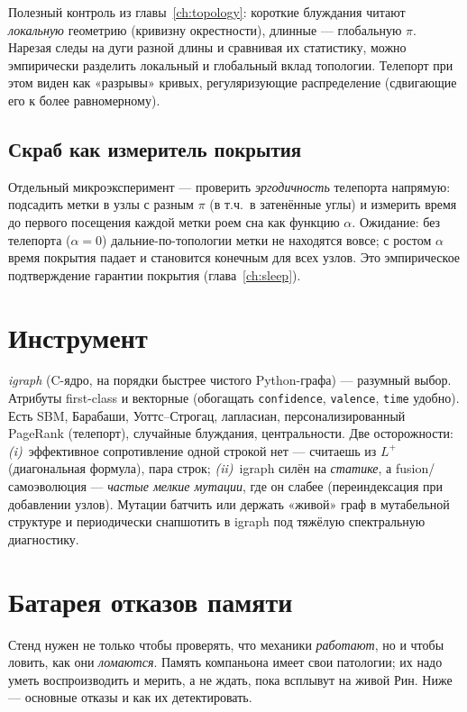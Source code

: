 Полезный контроль из главы~\ref{ch:topology}: короткие блуждания читают
\emph{локальную} геометрию (кривизну окрестности), длинные — глобальную $\pi$.
Нарезая следы на дуги разной длины и сравнивая их статистику, можно эмпирически
разделить локальный и глобальный вклад топологии. Телепорт при этом виден как
«разрывы» кривых, регуляризующие распределение (сдвигающие его к более равномерному).

\subsection{Скраб как измеритель покрытия}

Отдельный микроэксперимент — проверить \emph{эргодичность} телепорта напрямую:
подсадить метки в узлы с разным $\pi$ (в т.ч.\ в затенённые углы) и измерить время до
первого посещения каждой метки роем сна как функцию $\alpha$. Ожидание: без телепорта
($\alpha=0$) дальние-по-топологии метки не находятся вовсе; с ростом $\alpha$ время
покрытия падает и становится конечным для всех узлов. Это эмпирическое подтверждение
гарантии покрытия (глава~\ref{ch:sleep}).

\section{Инструмент}

\emph{igraph} (C-ядро, на порядки быстрее чистого Python-графа) — разумный выбор.
Атрибуты first-class и векторные (обогащать \texttt{confidence}, \texttt{valence},
\texttt{time} удобно). Есть SBM, Барабаши, Уоттс–Строгац, лапласиан,
персонализированный PageRank (телепорт), случайные блуждания, центральности. Две
осторожности: \emph{(i)}~эффективное сопротивление одной строкой нет — считаешь из
$L^{+}$ (диагональная формула), пара строк; \emph{(ii)}~igraph силён на \emph{статике},
а fusion/самоэволюция — \emph{частые мелкие мутации}, где он слабее (переиндексация при
добавлении узлов). Мутации батчить или держать «живой» граф в мутабельной структуре и
периодически снапшотить в igraph под тяжёлую спектральную диагностику.

\section{Батарея отказов памяти}
\label{sec:failuremodes}

Стенд нужен не только чтобы проверять, что механики \emph{работают}, но и чтобы
ловить, как они \emph{ломаются}. Память компаньона имеет свои патологии; их надо
уметь воспроизводить и мерить, а не ждать, пока всплывут на живой Рин. Ниже —
основные отказы и как их детектировать.

